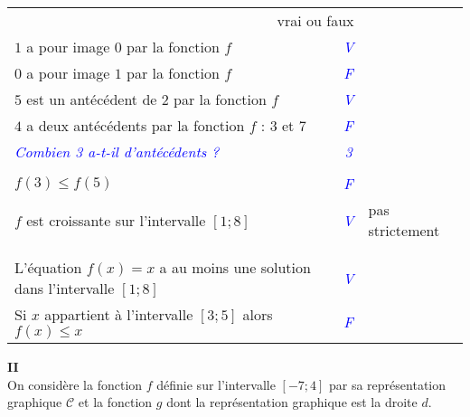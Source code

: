 \vspace{.1cm}

\begin{tabular}{|l|c|l}
\multicolumn{2}{r}{vrai ou faux} & \\
\cline{1-2}
$1$ a pour image $0$ par la fonction $f$ & \textcolor{blue} {\it \Large V } & \\
\cline{1-2}
$0$ a pour image $1$ par la fonction $f$ & \textcolor{blue} {\it \Large F } & \\
\cline{1-2}
$5$ est un antécédent de $2$ par la fonction $f$ & \textcolor{blue} {\it \Large V } & \\
\cline{1-2}
$4$ a deux  antécédents  par la fonction $f$ : $3$ et $7$ &  \textcolor{blue} {\it \Large F}& \\
\cline{1-2}
\textcolor{blue} {\it Combien 3 a-t-il d'antécédents ? }& \textcolor{blue} {\it \Large 3 }&\\
\cline{1-2}
& \\
\cline{1-2}
$f(3) \leqslant f(5) $ & \textcolor{blue} {\it \Large F } &\\
\cline{1-2}
$f$ est croissante sur l'intervalle $[1 ; 8]$ & \textcolor{blue} {\it \Large V } & pas strictement\\
\cline{1-2}
& \\
\cline{1-2}
& \\
\cline{1-2}
L'équation $f(x) = x $ a au moins une solution dans l'intervalle $[1 ; 8]$ &  \textcolor{blue} {\it \Large V } &\\
\cline{1-2}
Si $x$ appartient à l'intervalle $[3 ; 5]$ alors $f(x) \leqslant x $ & \textcolor{blue} {\it \Large F } &\\
\cline{1-2}
\end{tabular}

\medskip 

\textbf{II}\\

On considère la fonction $f$ définie sur l'intervalle $[-7 ; 4]$ par sa représentation graphique $\mathcal{C}$ et la fonction $g$ dont la représentation graphique est la droite $d$.
 
